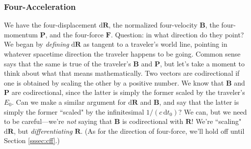 \documentclass[12pt]{article}
\renewcommand{\vv}[1]{\mathbf{#1}}
\newcommand{\dd}[1]{\mathrm{d}#1}
\begin{document}
\subsubsection{Four-Acceleration}\label{sssec:fa}

We have the four-displacement $\dd \vv R$, the normalized four-velocity $\vv B$, the four-momentum $\vv P$, and the four-force $\vv F$. Question: in what direction do they point? We began by \emph{defining} $\dd \vv R$ as tangent to a traveler's world line, pointing in whatever spacetime direction the traveler happens to be going. Common sense says that the same is true of the traveler's $\vv B$ and $\vv P$, but let's take a moment to think about what that means mathematically. Two vectors are codirectional if one is obtained by scaling the other by a positive number. We know that $\vv B$ and $\vv P$ are codirectional, since the latter is simply the former scaled by the traveler's $E_0$. Can we make a similar argument for $\dd \vv R$ and $\vv B$, and say that the latter is simply the former ``scaled" by the infinitesimal $1/(c \, \dd t_0)$? We can, but we need to be careful---we're \emph{not} saying that $\vv B$ is codirectional with $\vv R$! We're ``scaling" $\dd \vv R$, but \emph{differentiating} $\vv R$. (As for the direction of four-force, we'll hold off until Section \ref{sssec:cff}.)
\end{document}
